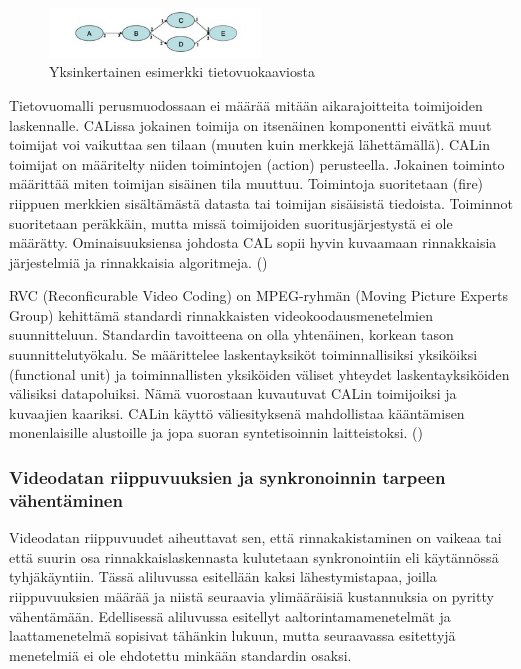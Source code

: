 \begin{figure}[ht]
	\centering
	\includegraphics[width=0.5\textwidth]{dataflow.jpg}
	\caption{Yksinkertainen esimerkki tietovuokaaviosta}
	\label{fig:dataflow}
\end{figure}

Tietovuomalli perusmuodossaan ei määrää mitään aikarajoitteita toimijoiden
laskennalle. CALissa jokainen toimija on itsenäinen komponentti eivätkä muut
toimijat voi vaikuttaa sen tilaan (muuten kuin merkkejä lähettämällä). CALin
toimijat on määritelty niiden toimintojen (action) perusteella. Jokainen
toiminto määrittää miten toimijan sisäinen tila muuttuu. Toimintoja
suoritetaan (fire) riippuen merkkien sisältämästä datasta tai toimijan
sisäisistä tiedoista. Toiminnot suoritetaan peräkkäin, mutta missä toimijoiden
suoritusjärjestystä ei ole määrätty. Ominaisuuksiensa johdosta CAL sopii hyvin 
kuvaamaan rinnakkaisia järjestelmiä ja rinnakkaisia algoritmeja. (\citealt{rvc})

RVC (Reconficurable Video Coding) on MPEG-ryhmän (Moving Picture Experts
Group) kehittämä standardi rinnakkaisten videokoodausmenetelmien suunnitteluun.
Standardin tavoitteena on olla yhtenäinen, korkean tason suunnittelutyökalu.
Se määrittelee laskentayksiköt toiminnallisiksi yksiköiksi (functional unit)
ja toiminnallisten yksiköiden väliset yhteydet laskentayksiköiden välisiksi
datapoluiksi. Nämä vuorostaan kuvautuvat CALin toimijoiksi ja kuvaajien
kaariksi. CALin käyttö väliesityksenä mahdollistaa kääntämisen monenlaisille
alustoille ja jopa suoran syntetisoinnin laitteistoksi. (\citealt{rvc})

\subsubsection{Videodatan riippuvuuksien ja synkronoinnin tarpeen vähentäminen}

Videodatan riippuvuudet aiheuttavat sen, että rinnakakistaminen on vaikeaa tai
että suurin osa rinnakkaislaskennasta kulutetaan synkronointiin eli käytännössä
tyhjäkäyntiin. Tässä aliluvussa esitellään kaksi lähestymistapaa, joilla
riippuvuuksien määrää ja niistä seuraavia ylimääräisiä kustannuksia on pyritty
vähentämään. Edellisessä aliluvussa esitellyt aaltorintamamenetelmät ja
laattamenetelmä sopisivat tähänkin lukuun, mutta seuraavassa esitettyjä
menetelmiä ei ole ehdotettu minkään standardin osaksi.

